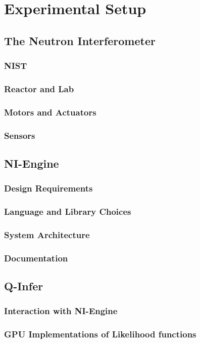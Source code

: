 
\chapter{Experimental Setup} %
\label{Chapter4}


\section{The Neutron Interferometer}
\subsection{NIST}
\subsection{Reactor and Lab}
\subsection{Motors and Actuators}
\subsection{Sensors}
\section{NI-Engine}
\subsection{Design Requirements}
\subsection{Language and Library Choices}
\subsection{System Architecture}
\subsection{Documentation}
\section{Q-Infer}
\subsection{Interaction with NI-Engine}
\subsection{GPU Implementations of Likelihood functions}

